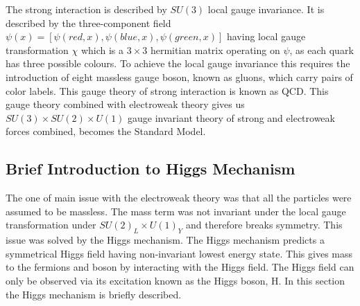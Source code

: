 
The strong interaction is described by $SU(3)$ local gauge invariance. It is described by the three-component field $\psi(x)=[\psi(red,x),\psi(blue,x),\psi(green,x)]$ having local gauge transformation $\chi$ which is a $3\times 3$ hermitian matrix operating on $\psi$, as each quark has three possible colours. To achieve the local gauge invariance this requires the introduction of eight massless gauge boson, known as gluons, which carry pairs of color labels. This gauge theory of strong interaction is known as QCD. This gauge theory combined with electroweak theory gives us $SU(3)\times SU(2) \times U(1)$ gauge invariant theory of strong and electroweak forces combined, becomes the Standard Model.






\subsection{Brief Introduction to Higgs Mechanism} %
\label{sub:brief_introduction_to_higgs_mechanism}
The one of main issue with the electroweak theory was that all the particles were assumed to be massless.
The mass term was not invariant under the local gauge transformation under $SU(2)_L \times U(1)_Y$ and therefore breaks symmetry.
This issue was solved by the Higgs mechanism.
The Higgs mechanism predicts a symmetrical Higgs field having non-invariant lowest energy state. This gives mass to the fermions and boson by interacting with the Higgs field. The Higgs field can only be observed via its excitation known as the Higgs boson, H. In this section the Higgs mechanism is briefly described.

